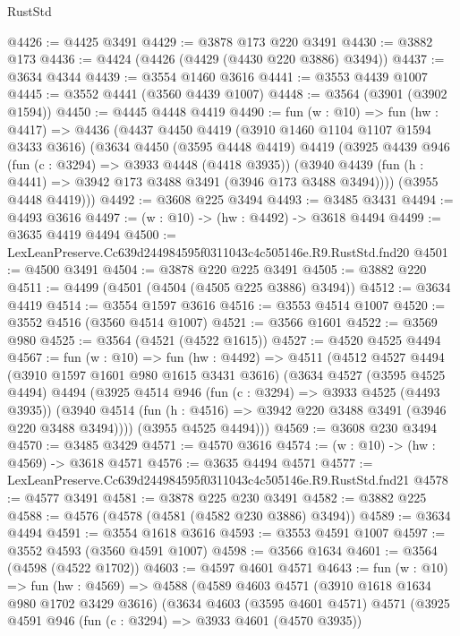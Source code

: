 \begin{lexlean}{RustStd}
\begin{coremodule}
@4426 := @4425 @3491
@4429 := @3878 @173 @220 @3491
@4430 := @3882 @173
@4436 := @4424 (@4426 (@4429 (@4430 @220 @3886) @3494))
@4437 := @3634 @4344
@4439 := @3554 @1460 @3616
@4441 := @3553 @4439 @1007
@4445 := @3552 @4441 (@3560 @4439 @1007)
@4448 := @3564 (@3901 (@3902 @1594))
@4450 := @4445 @4448 @4419
@4490 := fun (w : @10) =>
  fun (hw : @4417) =>
  @4436
    (@4437
      @4450
      @4419
      (@3910 @1460 @1104 @1107 @1594 @3433 @3616)
      (@3634
        @4450
        (@3595 @4448 @4419)
        @4419
        (@3925
          @4439
          @946
          (fun (c : @3294) => @3933 @4448 (@4418 @3935))
          (@3940 @4439 (fun (h : @4441) => @3942 @173 @3488 @3491 (@3946 @173 @3488 @3494))))
        (@3955 @4448 @4419)))
@4492 := @3608 @225 @3494
@4493 := @3485 @3431
@4494 := @4493 @3616
@4497 := (w : @10) -> (hw : @4492) -> @3618 @4494
@4499 := @3635 @4419 @4494
@4500 := LexLeanPreserve.Cc639d244984595f0311043c4c505146e.R9.RustStd.fnd20
@4501 := @4500 @3491
@4504 := @3878 @220 @225 @3491
@4505 := @3882 @220
@4511 := @4499 (@4501 (@4504 (@4505 @225 @3886) @3494))
@4512 := @3634 @4419
@4514 := @3554 @1597 @3616
@4516 := @3553 @4514 @1007
@4520 := @3552 @4516 (@3560 @4514 @1007)
@4521 := @3566 @1601
@4522 := @3569 @980
@4525 := @3564 (@4521 (@4522 @1615))
@4527 := @4520 @4525 @4494
@4567 := fun (w : @10) =>
  fun (hw : @4492) =>
  @4511
    (@4512
      @4527
      @4494
      (@3910 @1597 @1601 @980 @1615 @3431 @3616)
      (@3634
        @4527
        (@3595 @4525 @4494)
        @4494
        (@3925
          @4514
          @946
          (fun (c : @3294) => @3933 @4525 (@4493 @3935))
          (@3940 @4514 (fun (h : @4516) => @3942 @220 @3488 @3491 (@3946 @220 @3488 @3494))))
        (@3955 @4525 @4494)))
@4569 := @3608 @230 @3494
@4570 := @3485 @3429
@4571 := @4570 @3616
@4574 := (w : @10) -> (hw : @4569) -> @3618 @4571
@4576 := @3635 @4494 @4571
@4577 := LexLeanPreserve.Cc639d244984595f0311043c4c505146e.R9.RustStd.fnd21
@4578 := @4577 @3491
@4581 := @3878 @225 @230 @3491
@4582 := @3882 @225
@4588 := @4576 (@4578 (@4581 (@4582 @230 @3886) @3494))
@4589 := @3634 @4494
@4591 := @3554 @1618 @3616
@4593 := @3553 @4591 @1007
@4597 := @3552 @4593 (@3560 @4591 @1007)
@4598 := @3566 @1634
@4601 := @3564 (@4598 (@4522 @1702))
@4603 := @4597 @4601 @4571
@4643 := fun (w : @10) =>
  fun (hw : @4569) =>
  @4588
    (@4589
      @4603
      @4571
      (@3910 @1618 @1634 @980 @1702 @3429 @3616)
      (@3634
        @4603
        (@3595 @4601 @4571)
        @4571
        (@3925
          @4591
          @946
          (fun (c : @3294) => @3933 @4601 (@4570 @3935))

\end{coremodule}
\end{lexlean}
